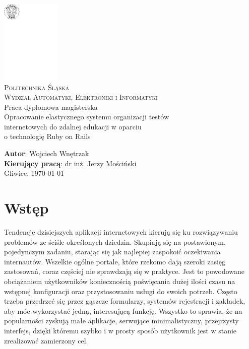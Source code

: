 \documentclass[12pt,twoside]{report}
\begin{document}
\pagestyle{fancy}
\lhead{\nouppercase{\rightmark}}
\rhead{\nouppercase{\leftmark}}
\renewcommand{\chaptermark}[1]{\markboth{\chaptername \ \thechapter. \ #1}{}}
\renewcommand{\sectionmark}[1]{\markright{#1}{}}
\fancyhead{}
\fancyfoot{}
\fancyhead[LO]{\rightmark}
\fancyhead[RE]{\leftmark}
\fancyhead[LE]{\thepage}
\fancyhead[RO]{\thepage}

\begin{titlepage}
  \begin{center}
    \includegraphics[width=80pt]{images/godlo.pdf}\\[30pt]
    \Large\textsc{Politechnika Śląska}\\[0.5em]
    \textsc{Wydział Automatyki, Elektroniki i Informatyki}\\[100pt]
    \LARGE Praca dyplomowa magisterska\\[50pt]
    Opracowanie elastycznego systemu organizacji testów\\[0.5em]
    internetowych do zdalnej edukacji w oparciu\\[0.5em]
    o technologię Ruby on Rails\\[80pt]
  \end{center}
  \Large\textbf{Autor}: Wojciech Wnętrzak\\
  \Large\textbf{Kierujący pracą}: dr inż. Jerzy Mościński\\
  \vfill
  \normalsize\centering Gliwice, \today
\end{titlepage}

\tableofcontents

\cleardoublepage
\chapter{Wstęp}
Tendencje dzisiejszych aplikacji internetowych kierują się ku rozwiązywaniu problemów ze
ściśle określonych dziedzin. Skupiają się na postawionym, pojedynczym zadaniu, starając
się jak najlepiej zaspokoić oczekiwania internautów. Wszelkie ogólne portale, które
rzekomo dają szeroki zasięg zastosowań, coraz częściej nie sprawdzają się w
praktyce. Jest to powodowane obciążaniem użytkowników koniecznością poświęcania dużej
ilości czasu na wstępnej konfiguracji oraz przystosowaniu usługi do swoich potrzeb.
Często trzeba przedrzeć się przez gąszcze formularzy, systemów rejestracji i zakładek, aby
móc wykorzystać jedną, interesującą funkcję. Wszystko to sprawia, że na popularności
zyskują małe aplikacje, serwujące minimalistyczny, przejrzysty interfejs, dzięki któremu
szybko i w prosty sposób użytkownik jest w stanie zrealizować zamierzony cel.
\end{document}
